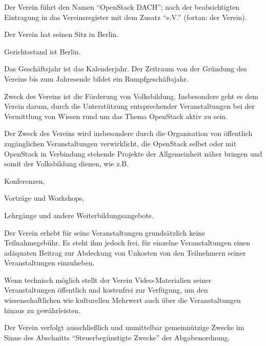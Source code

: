 \documentclass[draft]{scrartcl}
\newcommand{\VereinsName}{OpenStack DACH}
\begin{document}
\pagebreak
\ihead{\footnotesize \thetitle}
\begin{contract}


Der Verein führt den Namen "`\VereinsName"'; nach der beabsichtigten
Eintragung in das Vereinsregister mit dem Zusatz "`e.V."' (fortan: der
Verein).

Der Verein hat seinen Sitz in Berlin.

Gerichtsstand ist Berlin.

Das Geschäftsjahr ist das Kalenderjahr. Der Zeitraum von der Gründung des
Vereins bis zum Jahresende bildet ein Rumpfgeschäftsjahr.


\parnumberfalse

\label{Zweck}
Zweck des Vereins ist die Förderung von Volksbildung. Insbesondere geht es
dem Verein darum, durch die Unterstützung entsprechender Veranstaltungen
bei der Vermittlung von Wissen rund um das Thema OpenStack aktiv zu sein.

Der Zweck des Vereins wird insbesondere durch die Organisation von öffentlich
zu\-gäng\-li\-chen Veranstaltungen verwirklicht, die OpenStack selbst oder
mit OpenStack in Verbindung stehende Projekte der Allgemeinheit näher
bringen und somit der Volksbildung dienen, wie z.B.

\begin{compactitem}
  \item Konferenzen,
  \item Vorträge und Workshops,
  \item Lehrgänge und andere Weiterbildungsangebote.
\end{compactitem}

Der Verein erhebt für seine Veranstaltungen grundsätzlich keine Teilnahmegebühr.
Es steht ihm jedoch frei, für einzelne Veranstaltungen einen adäquaten Beitrag zur
Abdeckung von Unkosten von den Teilnehmern seiner Veranstaltungen einzuheben.

Wenn technisch möglich stellt der Verein Video-Materialien seiner Veranstaltungen
öf\-fent\-lich und kostenfrei zur Verfügung, um den wissenschaftlichen wie kulturellen
Mehrwert auch über die Veranstaltungen hinaus zu gewährleisten.

\label{Gemeinnuetzigkeit}

Der Verein verfolgt ausschließlich und unmittelbar gemeinnützige Zwecke im
Sinne des Abschnitts "`Steuerbegünstigte Zwecke"' der Abgabenordnung.


\end{contract}
\end{document}

